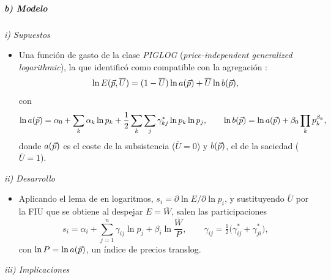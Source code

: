 \documentclass[11pt]{article}
\begin{document}
\subparagraph{b) Modelo}

\hspace*{3.6em}\emph{i) Supuestos}

\begin{itemize}
\item Una función de gasto de la clase \emph{PIGLOG} (\emph{price-independent generalized logarithmic}), la que \textcite{Muellbauer1975Aggregation,Muellbauer1976Community} identificó como compatible con la agregación :
  \begin{equation}
  \ln E(\vec{p},\overline{U})=(1-\overline{U})\ln a(\vec{p})+\overline{U}\ln b(\vec{p}), \label{eq:aids-e}
  \end{equation}
  con
  \begin{equation*}
  \ln a(\vec{p})=\alpha_0+\sum_k\alpha_k\ln p_k+\frac12\sum_k\sum_j\gamma^*_{kj}\ln p_k\ln p_j,\qquad \ln b(\vec{p})=\ln a(\vec{p})+\beta_0\prod_kp_k^{\beta_k},
  \end{equation*}
  donde $a(\vec{p})$ es el coste de la subsistencia ($\overline{U}=0$) y $b(\vec{p})$, el de la saciedad ($\overline{U}=1$).
\end{itemize}

\hspace*{3.6em}\emph{ii) Desarrollo}

\begin{itemize}
\item Aplicando el lema de  en logaritmos, $s_i=\partial\ln E/\partial\ln p_i$, y sustituyendo $\overline{U}$ por la FIU que se obtiene al despejar $E=\overline{W}$, salen las participaciones
  \begin{equation}
  s_i=\alpha_i+\sum_{j=1}^{n}\gamma_{ij}\ln p_j+\beta_i\ln\frac{\overline{W}}{P},\qquad\gamma_{ij}=\tfrac12\big(\gamma^*_{ij}+\gamma^*_{ji}\big), \label{eq:aids}
  \end{equation}
  con $\ln P=\ln a(\vec{p})$, un índice de precios translog.
\end{itemize}

\hspace*{3.6em}\emph{iii) Implicaciones}
\end{document}
